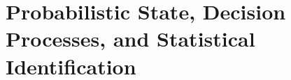 \chapter{Probabilistic State, Decision Processes, and Statistical Identification}\label{ch:C02}








